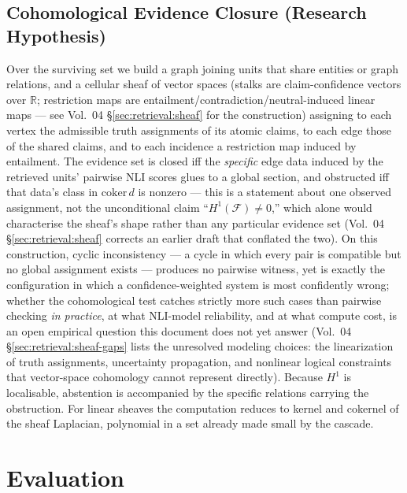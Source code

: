\subsection{Cohomological Evidence Closure (Research Hypothesis)}
\label{sec:paper:sheaf}
Over the surviving set we build a graph joining units that share entities or graph relations, and a cellular sheaf of vector spaces (stalks are claim-confidence vectors over $\mathbb{R}$; restriction maps are entailment/contradiction/neutral-induced linear maps --- see Vol.~04 \S\ref{sec:retrieval:sheaf} for the construction) assigning to each vertex the admissible truth assignments of its atomic claims, to each edge those of the shared claims, and to each incidence a restriction map induced by entailment. The evidence set is closed iff the \emph{specific} edge data induced by the retrieved units' pairwise NLI scores glues to a global section, and obstructed iff that data's class in $\mathrm{coker}\,d$ is nonzero --- this is a statement about one observed assignment, not the unconditional claim ``$H^1(\mathcal{F}) \neq 0$,'' which alone would characterise the sheaf's shape rather than any particular evidence set (Vol.~04 \S\ref{sec:retrieval:sheaf} corrects an earlier draft that conflated the two). On this construction, cyclic inconsistency --- a cycle in which every pair is compatible but no global assignment exists --- produces no pairwise witness, yet is exactly the configuration in which a confidence-weighted system is most confidently wrong; whether the cohomological test catches strictly more such cases than pairwise checking \emph{in practice}, at what NLI-model reliability, and at what compute cost, is an open empirical question this document does not yet answer (Vol.~04 \S\ref{sec:retrieval:sheaf-gaps} lists the unresolved modeling choices: the linearization of truth assignments, uncertainty propagation, and nonlinear logical constraints that vector-space cohomology cannot represent directly). Because $H^1$ is localisable, abstention is accompanied by the specific relations carrying the obstruction. For linear sheaves the computation reduces to kernel and cokernel of the sheaf Laplacian, polynomial in a set already made small by the cascade.

\section{Evaluation}
\label{sec:paper:eval}

